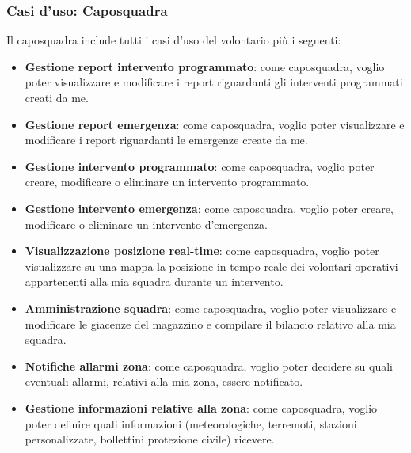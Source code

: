 \subsubsection{Casi d'uso: Caposquadra}
Il caposquadra include tutti i casi d'uso del volontario più i seguenti:
\begin{itemize}
	\item \textbf{Gestione report intervento programmato}:
	come caposquadra, voglio poter visualizzare e modificare i report riguardanti gli interventi programmati creati da me.
	
	\item \textbf{Gestione report emergenza}:
	come caposquadra, voglio poter visualizzare e modificare i report riguardanti le emergenze create da me.
	
	\item \textbf{Gestione intervento programmato}:
	come caposquadra, voglio poter creare, modificare o eliminare un intervento programmato.
	
	\item \textbf{Gestione intervento emergenza}:
	come caposquadra, voglio poter creare, modificare o eliminare un intervento d'emergenza.
	
	\item \textbf{Visualizzazione posizione real-time}:
	come caposquadra, voglio poter visualizzare su una mappa la posizione in tempo reale dei volontari operativi appartenenti alla mia squadra durante un intervento.
	
	\item \textbf{Amministrazione squadra}:
	come caposquadra, voglio poter visualizzare e modificare le giacenze del magazzino e compilare il bilancio relativo alla mia squadra.
	
	\item \textbf{Notifiche allarmi zona}:
	come caposquadra, voglio poter decidere su quali eventuali allarmi, relativi alla mia zona, essere notificato.
	
	\item \textbf{Gestione informazioni relative alla zona}:
	come caposquadra, voglio poter definire quali informazioni (meteorologiche, terremoti, stazioni personalizzate, bollettini protezione civile) ricevere.
\end{itemize}




